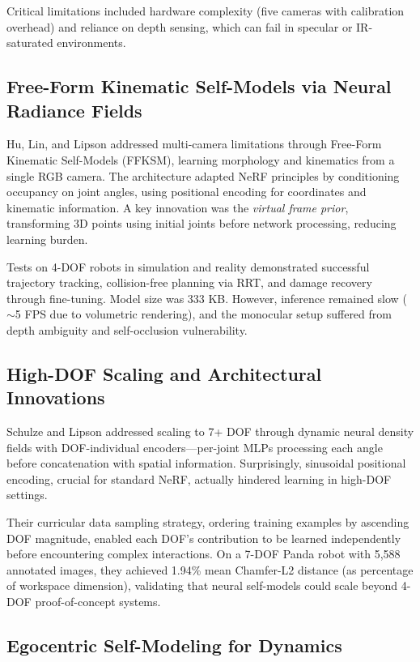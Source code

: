 \documentclass[journal]{IEEEtran}
\begin{document}
Critical limitations included hardware complexity (five cameras with calibration overhead) and reliance on depth sensing, which can fail in specular or IR-saturated environments.

\subsection{Free-Form Kinematic Self-Models via Neural Radiance Fields}

Hu, Lin, and Lipson \cite{hu2024a} addressed multi-camera limitations through Free-Form Kinematic Self-Models (FFKSM), learning morphology and kinematics from a single RGB camera. The architecture adapted NeRF principles by conditioning occupancy on joint angles, using positional encoding for coordinates and kinematic information. A key innovation was the \textit{virtual frame prior}, transforming 3D points using initial joints before network processing, reducing learning burden.

Tests on 4-DOF robots in simulation and reality demonstrated successful trajectory tracking, collision-free planning via RRT, and damage recovery through fine-tuning. Model size was 333 KB. However, inference remained slow ($\sim$5 FPS due to volumetric rendering), and the monocular setup suffered from depth ambiguity and self-occlusion vulnerability.

\subsection{High-DOF Scaling and Architectural Innovations}

Schulze and Lipson \cite{schulze2024} addressed scaling to 7+ DOF through dynamic neural density fields with DOF-individual encoders---per-joint MLPs processing each angle before concatenation with spatial information. Surprisingly, sinusoidal positional encoding, crucial for standard NeRF, actually hindered learning in high-DOF settings.

Their curricular data sampling strategy, ordering training examples by ascending DOF magnitude, enabled each DOF's contribution to be learned independently before encountering complex interactions. On a 7-DOF Panda robot with 5,588 annotated images, they achieved 1.94\% mean Chamfer-L2 distance (as percentage of workspace dimension), validating that neural self-models could scale beyond 4-DOF proof-of-concept systems.

\subsection{Egocentric Self-Modeling for Dynamics}
\end{document}
